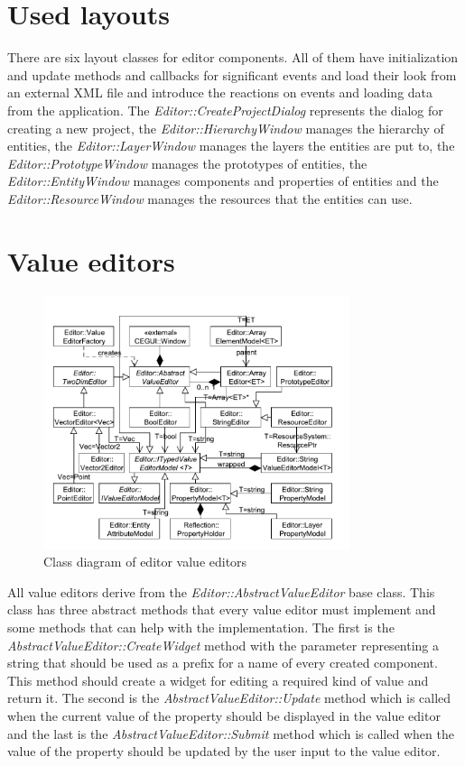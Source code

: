 \documentclass[a4paper, 12pt]{report}
\begin{document}
\section{Used layouts}

There are six layout classes for editor components. All of them have initialization and update methods and callbacks for significant events and load their look from an external XML file and introduce the reactions on events and loading data from the application. The \emph{Editor::Create\-Project\-Dialog} represents the dialog for creating a new project, the \emph{Editor\-::\-Hierarchy\-Window} manages the hierarchy of entities, the \emph{Editor\-::\-Layer\-Window} manages the layers the entities are put to, the \emph{Editor\-::\-Prototype\-Window} manages the prototypes of entities, the \emph{Editor\-::\-Entity\-Window} manages components and properties of entities and the \emph{Editor\-::\-Resource\-Window} manages the resources that the entities can use.

\section{Value editors}

\begin{figure}[htbp]
	\centering
		\includegraphics[width=0.8\textwidth]{EditorValueEditorsClassDiagram.pdf}
	\caption{Class diagram of editor value editors}
	\label{fig:editor-value-editors-diagram}
\end{figure}

All value editors derive from the \emph{Editor::AbstractValueEditor} base class. This class has three abstract methods that every value editor must implement and some methods that can help with the implementation. The first is the \emph{AbstractValueEditor::CreateWidget} method with the parameter representing a string that should be used as a prefix for a name of every created component. This method should create a widget for editing a required kind of value and return it. The second is the \emph{AbstractValueEditor::Update} method which is called when the current value of the property should be displayed in the value editor and the last is the \emph{AbstractValueEditor::Submit} method which is called when the value of the property should be updated by the user input to the value editor.
\end{document}
